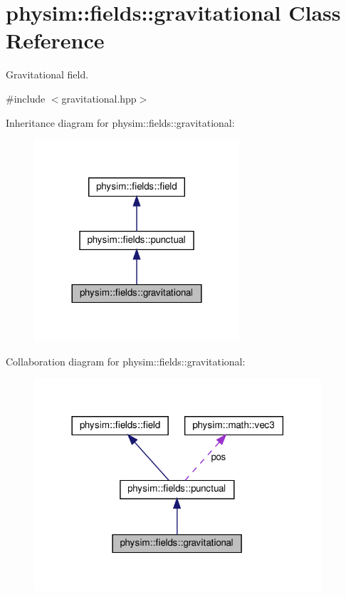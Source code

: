\hypertarget{classphysim_1_1fields_1_1gravitational}{}\section{physim\+:\+:fields\+:\+:gravitational Class Reference}
\label{classphysim_1_1fields_1_1gravitational}


Gravitational field.  




{\ttfamily \#include $<$gravitational.\+hpp$>$}



Inheritance diagram for physim\+:\+:fields\+:\+:gravitational\+:\nopagebreak
\begin{figure}[H]
\begin{center}
\leavevmode
\includegraphics[width=216pt]{classphysim_1_1fields_1_1gravitational__inherit__graph}
\end{center}
\end{figure}


Collaboration diagram for physim\+:\+:fields\+:\+:gravitational\+:\nopagebreak
\begin{figure}[H]
\begin{center}
\leavevmode
\includegraphics[width=302pt]{classphysim_1_1fields_1_1gravitational__coll__graph}
\end{center}
\end{figure}
